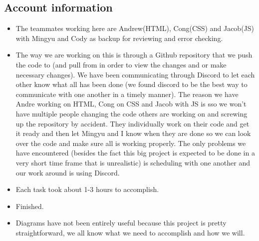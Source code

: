 \documentclass[12pt]{article}
\begin{document}
		\subsection{Account information}
		\begin{itemize}

		\item The teammates working here are Andrew(HTML), Cong(CSS) and Jacob(JS) with Mingyu and Cody as backup for reviewing and error checking.

		\item The way we are working on this is through a Github repository that we push the code to (and pull from in order to view the changes and or make necessary changes).  We have been communicating through Discord to let each other know what all has been done (we found discord to be the best way to communicate with one another in a timely manner).  The reason we have Andre working on HTML, Cong on CSS and Jacob with JS is sso we won’t have multiple people changing the code others are working on and screwing up the repository by accident.  They individually work on their code and get it ready and then let Mingyu and I know when they are done so we can look over the code and make sure all is working properly.  The only problems we have encountered (besides the fact this big project is expected to be done in a very short time frame that is unrealistic) is scheduling with one another and our work around is using Discord.

		\item Each task took about 1-3 hours to accomplish.

		\item Finished.

		\item Diagrams have not been entirely useful because this project is pretty straightforward, we all know what we need to accomplish and how we will.

		\end{itemize}
\end{document}
